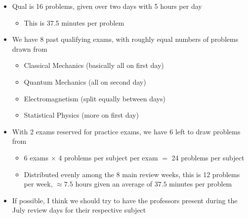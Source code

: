 \documentclass[12pt]{article}
\begin{document}
\begin{itemize}
\item
Qual is 16 problems, given over two days with 5 hours per day
\begin{itemize}
\item
This is 37.5 minutes per problem

\end{itemize}

\item
We have 8 past qualifying exams, with roughly equal numbers of problems drawn from
\begin{itemize}
\item
Classical Mechanics (basically all on first day)

\item
Quantum Mechanics (all on second day)

\item
Electromagnetism (split equally between days)

\item
Statistical Physics (more on first day)

\end{itemize}

\item
With 2 exams reserved for practice exams, we have 6 left to draw problems from
\begin{itemize}
\item
6 exams $\times$ 4 problems per subject per exam $=$ 24 problems per subject

\item
Distributed evenly among the 8 main review weeks, this is 12 problems per week, $\approx 7.5$ hours given an average of $37.5$ minutes per problem

\end{itemize}

\item
If possible, I think we should try to have the professors present during the July review days for their respective subject

\end{itemize}
\end{document}
